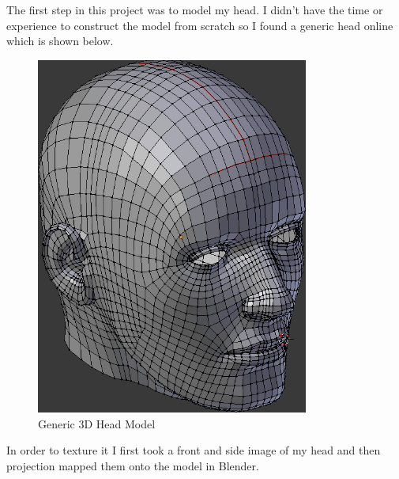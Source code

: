 \documentclass{article}
\begin{document}
The first step in this project was to model my head. I didn't have the time or
experience to construct the model from scratch so I found a generic head online
which is shown below.

\vfill
\begin{figure}[H]
    \centering
    \includegraphics[width=0.8\textwidth]{model.png}
    \caption{Generic 3D Head Model}
\end{figure}
\vfill

\newpage
In order to texture it I first took a front and side image of my head and then
projection mapped them onto the model in Blender.
\end{document}
